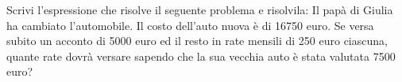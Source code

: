 \item Scrivi l'espressione che risolve il seguente problema e risolvila: Il papà di Giulia ha cambiato l'automobile. Il costo dell'auto nuova è di 16750 euro. Se versa subito un acconto di 5000 euro ed il resto in rate mensili di 250 euro ciascuna, quante rate dovrà versare sapendo che la sua vecchia auto è stata valutata 7500 euro?